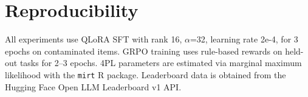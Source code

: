 \documentclass[11pt,a4paper]{article}
\begin{document}



\appendix

\section{Reproducibility}

All experiments use QLoRA SFT with rank 16, $\alpha$=32, learning rate 2e-4, for 3 epochs on contaminated items.
GRPO training uses rule-based rewards on held-out tasks for 2--3 epochs.
4PL parameters are estimated via marginal maximum likelihood with the \texttt{mirt} R package.
Leaderboard data is obtained from the Hugging Face Open LLM Leaderboard v1 API.
\end{document}
